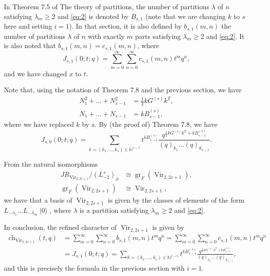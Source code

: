 \documentclass[a4paper, 12pt, reqno]{amsart}
\DeclareMathOperator{\Vir}{Vir}
\DeclareMathOperator{\ch}{ch}
\DeclareMathOperator{\vac}{|0\rangle}
\DeclareMathOperator{\gr}{gr}
\begin{document}
In Theorem 7.5 of The theory of partitions, the number of partitions $\lambda$ of $n$ satisfying $\lambda_m \ge 2$ and \eqref{eq:2} is denoted by $B_{s, 1}$ (note that we are changing $k$ to $s$ here and setting $i = 1$).
In that section, it is also defined by $b_{s, 1}(m, n)$ the number of partitions $\lambda$ of $n$ with exactly $m$ parts satisfying $\lambda_m \ge 2$ and \eqref{eq:2}.
It is also noted that $b_{s, 1}(m, n) = c_{s, 1}(m, n)$, where
\begin{equation*}
  J_{s, 1}(0; t; q) = \sum_{m = 0}^{\infty}\sum_{n = 0}^{\infty}c_{s, 1}(m, n)t^mq^n,
\end{equation*}
and we have changed $x$ to $t$.

Note that, using the notation of Theorem 7.8 and the previous section, we have
\begin{align*}
  N_1^2 + \dots + N_{s - 1}^2 &= \frac{1}{2}kG^{(s)}k^T, \\
  N_1 + \dots + N_{s - 1} &= kB^{(s)}_{s - 1},
\end{align*}
where we have replaced $k$ by $s$.
By (the proof of) Theorem 7.8, we have
\begin{equation*}
  J_{s, 0}(0; t; q) = \sum_{k = (k_1, \dots, k_s) \in \mathbb{N}^{s - 1}}t^{kB^{(s)}_{s - 1}}\frac{q^{\frac{1}{2}kG^{(s)}k^T + kB^{(s)}_{s - 1}}}{(q)_{k_1}\dots(q)_{k_{s - 1}}}.
\end{equation*}

From the natural isomorphisms
\begin{align*}
  JR_{\Vir_{2, 2s + 1}}/(L_{-2}^s)_{\partial} &\cong \gr_F(\Vir_{2, 2s + 1}), \\
  \gr_F(\Vir_{2, 2s + 1}) &\cong \Vir_{2, 2s + 1},
\end{align*}
we have that a basis of $\Vir_{2, 2s + 1}$ is given by the classes of elements of the form $L_{-\lambda_1}\dots L_{-\lambda_m}\vac$, where $\lambda$ is a partition satisfying $\lambda_m \ge 2$ and \eqref{eq:2}.

In conclusion, the refined character of $\Vir_{2, 2s + 1}$ is given by 
\begin{align*}
  \ch_{\Vir_{2, 2s + 1}}(t, q) &= \sum_{m = 0}^{\infty}\sum_{n = 0}^{\infty}b_{s, 1}(m, n)t^mq^n = \sum_{m = 0}^{\infty}\sum_{n = 0}^{\infty}c_{s, 1}(m, n)t^mq^n \\
                               &= J_{s, 1}(0; t; q) = \sum_{k = (k_1, \dots, k_s) \in \mathbb{N}^{s - 1}}t^{kB^{(s)}_{s - 1}}\frac{q^{\frac{1}{2}kG^{(s)}k^T + kB^{(s)}_{s - 1}}}{(q)_{k_1}\dots(q)_{k_{s - 1}}},
\end{align*}
and this is precisely the formula in the previous section with $i = 1$.
\end{document}
